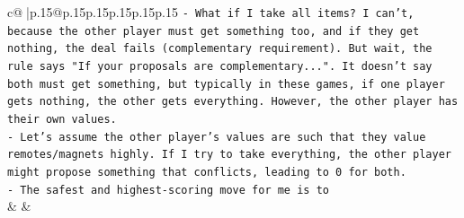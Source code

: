 \documentclass{article}
\begin{document}
{\begin{supertabular}{c@{$\;$}|p{.15\linewidth}@{}p{.15\linewidth}p{.15\linewidth}p{.15\linewidth}p{.15\linewidth}p{.15\linewidth}}
{{{\texttt{{-} What if I take all items? I can't, because the other player must get something too, and if they get nothing, the deal fails (complementary requirement). But wait, the rule says "If your proposals are complementary...". It doesn't say both must get something, but typically in these games, if one player gets nothing, the other gets everything. However, the other player has their own values.} \\
\texttt{{-} Let's assume the other player's values are such that they value remotes/magnets highly. If I try to take everything, the other player might propose something that conflicts, leading to 0 for both.} \\
\texttt{{-} The safest and highest{-}scoring move for me is to} \\
            }
        }
    }
    & & \\ \\


\end{supertabular}}
\end{document}
